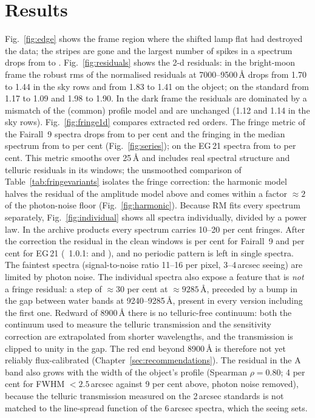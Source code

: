 \section{Results}
\label{sec:results_fringe}
Fig.~\ref{fig:edge} shows the frame region where the shifted lamp flat had destroyed the data; the stripes are gone
and the largest number of spikes in a spectrum drops from \SpMaxOld{} to \SpMaxNew. Fig.~\ref{fig:residuals} shows the
2-d residuals: in the bright-moon frame the robust rms of the normalised residuals at 7000--9500\,\AA{} drops from
1.70 to 1.44 in the sky rows and from 1.83 to 1.41 on the object; on the standard from 1.17 to 1.09 and 1.98 to 1.90.
In the dark frame the residuals are dominated by a mismatch of the (common) profile model and are unchanged (1.12 and
1.14 in the sky rows). Fig.~\ref{fig:fringe1d} compares extracted red orders. The fringe metric of the Fairall~9 spectra
drops from \FrOld{} to \FrNewOpt{} per cent and the fringing in the median spectrum from \FrMedOld{} to \FrMedNewOpt{}
per cent (Fig.~\ref{fig:series}); on the EG\,21 spectra from \EGfrOld{} to \EGfrNew{} per cent. This metric
smooths over 25\,\AA{} and includes real spectral structure and telluric residuals in its windows; the unsmoothed
comparison of Table~\ref{tab:fringevariants} isolates the fringe correction: the harmonic model halves the residual
of the amplitude model above and comes within a factor $\approx2$ of the photon-noise floor (Fig.~\ref{fig:harmonic}). Because RM fits every
spectrum separately, Fig.~\ref{fig:individual} shows all spectra individually, divided by a power law. In the archive
products every spectrum carries 10--20 per cent fringes. After the correction the residual in the clean windows is
\IndivNewF{} per cent for Fairall~9 and \IndivNewE{} per cent for EG\,21 (\banzai{}~1.0.1: \IndivOldF{} and
\IndivOldE), and no periodic pattern is left in single spectra. The faintest spectra (signal-to-noise ratio 11--16 per
pixel, 3--4\,arcsec seeing) are limited by photon noise. The individual spectra also expose a feature that is \emph{not} a fringe residual:
a step of $\approx30$ per cent at $\approx9285$\,\AA{}, preceded by a bump in the gap between water bands at
9240--9285\,\AA, present in every version including the first one. Redward of 8900\,\AA{} there is no telluric-free
continuum: both the continuum used to measure the telluric transmission and the sensitivity correction are extrapolated
from shorter wavelengths, and the transmission is clipped to unity in the gap. The red end beyond 8900\,\AA{} is
therefore not yet reliably flux-calibrated (Chapter~\ref{sec:recommendations}). The residual in the A band also grows
with the width of the object's profile (Spearman $\rho=0.80$; 4 per cent for FWHM $<2.5$\,arcsec against 9 per cent
above, photon noise removed), because the telluric transmission measured on the 2\,arcsec standards is not matched to
the line-spread function of the 6\,arcsec spectra, which the seeing sets.

